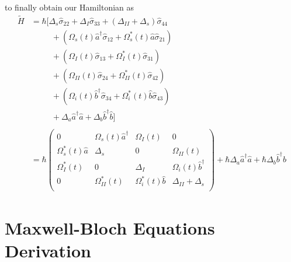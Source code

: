 \documentclass[aps,pra,showpacs,amsmath,amssymb,nofootinbib,longbibliography,superscriptaddress
]{revtex4-1}
\theoremstyle{definition}
\theoremstyle{remark}
\newcommand{\0}{\hat{0}}
\begin{document}
to finally obtain our Hamiltonian as
\begin{align}
    \tilde{H}
    &=
    \hbar \biggl[
        \Delta_s \hat{\sigma}_{22} +
        \Delta_I \hat{\sigma}_{33} +
        (\Delta_{II} + \Delta_s) \hat{\sigma}_{44} \nonumber \\
        &\;\;\;\;\;\;\;\;\;+
        \left(
            \Omega_{s}(t) \hat{a}^{\dagger} \hat{\sigma}_{12} +
            \Omega_{s}^*(t) \hat{a} \hat{\sigma}_{21}
        \right) \nonumber \\
        &\;\;\;\;\;\;\;\;\;+
        \left(
            \Omega_{I}(t) \hat{\sigma}_{13} +
            \Omega_{I}^*(t) \hat{\sigma}_{31}
        \right)\nonumber \\
        &\;\;\;\;\;\;\;\;\;+
        \left(
            \Omega_{II}(t) \hat{\sigma}_{24} +
            \Omega_{II}^*(t) \hat{\sigma}_{42}
        \right) \nonumber \\
        &\;\;\;\;\;\;\;\;\;+
        \left(
            \Omega_{i}(t) \hat{b}^{\dagger} \hat{\sigma}_{34} +
            \Omega_{i}^*(t) \hat{b} \hat{\sigma}_{43}
        \right) \nonumber \\
        &\;\;\;\;\;\;\;\;\;+
        \Delta_a \hat{a}^{\dagger}\hat{a} +
        \Delta_b \hat{b}^{\dagger}\hat{b}
    \biggr] \\ \nonumber \\
    &=
    \hbar \left(
        \begin{array}{cccc}
            0 & \Omega_{s}(t) \hat{a}^{\dagger} & \Omega_{I}(t) & 0\\
            \Omega_{s}^*(t) \hat{a} & \Delta_s & 0 & \Omega_{II}(t)\\
            \Omega_{I}^*(t) & 0 & \Delta_I & \Omega_{i}(t) \hat{b}^{\dagger}\\
            0 & \Omega_{II}^*(t) & \Omega_{i}^*(t) \hat{b} & \Delta_{II} + \Delta_s\\
        \end{array}
    \right) +
    \hbar \Delta_a \hat{a}^{\dagger}\hat{a} +
    \hbar \Delta_b  \hat{b}^{\dagger}\hat{b}
\end{align}





\pagebreak
\section{Maxwell-Bloch Equations Derivation}\label{MBEDerivation}
\end{document}
